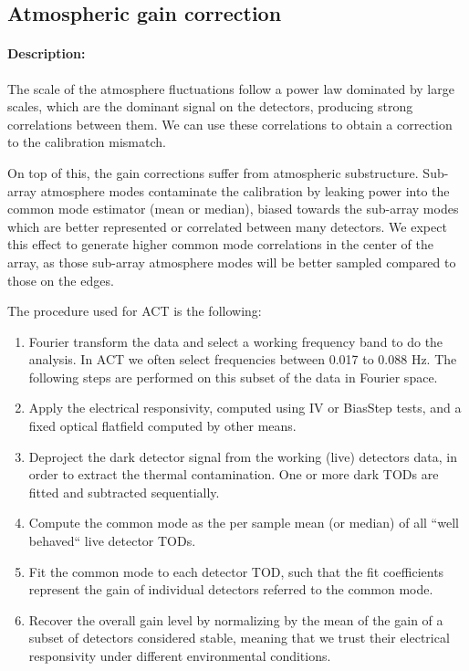 \subsection{Atmospheric gain correction}

\paragraph{Description:}
The scale of the atmosphere fluctuations follow a power law dominated by large scales, which are the dominant signal on the detectors, producing strong correlations between them. We can use these correlations to obtain a correction to the calibration mismatch. 

On top of this, the gain corrections suffer from atmospheric substructure. Sub-array atmosphere modes contaminate the calibration by leaking power into the common mode estimator (mean or median), biased towards the sub-array modes which are better represented or correlated between many detectors. We expect this effect to generate higher common mode correlations in the center of the array, as those sub-array atmosphere modes will be better sampled compared to those on the edges.

The procedure used for ACT is the following:

\begin{enumerate}
\item Fourier transform the data and select a working frequency band to do the analysis. In ACT we often select frequencies between 0.017 to 0.088 Hz. The following steps are performed on this subset of the data in Fourier space.
\item Apply the electrical responsivity, computed using IV or BiasStep tests, and a fixed optical flatfield computed by other means.
\item Deproject the dark detector signal from the working (live) detectors data, in order to extract the thermal contamination. One or more dark TODs are fitted and subtracted sequentially.
\item Compute the common mode as the per sample mean (or median) of all ``well behaved`` live detector TODs.
\item Fit the common mode to each detector TOD, such that the fit coefficients represent the gain of individual detectors referred to the common mode.
\item Recover the overall gain level by normalizing by the mean of the gain of a subset of detectors considered stable, meaning that we trust their electrical responsivity under different environmental conditions.
\end{enumerate}

